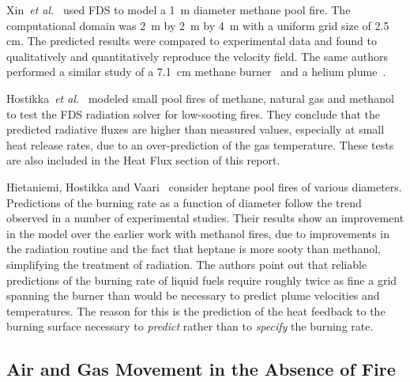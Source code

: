 Xin~{\em et  al.}~\cite{Xin:JSS2005} used FDS to model  a 1~m diameter methane pool  fire.  The  computational domain was  2~m by 2~m  by 4~m with  a
uniform  grid  size of  2.5  cm.  The  predicted results  were compared  to   experimental  data  and  found   to  qualitatively  and quantitatively
reproduce   the  velocity  field.   The  same  authors performed a similar study of a 7.1~cm methane burner~\cite{Xin:CF2005} and a helium
plume~\cite{Xin:CS2002}.

Hostikka~{\em et al.}~\cite{Hostikka:3} modeled small pool fires of
methane, natural gas and methanol  to test the FDS radiation solver for low-sooting
fires.  They conclude that the predicted radiative fluxes are higher than measured values, especially at small heat
release rates, due to an over-prediction of the gas temperature. These
tests are also included in the Heat Flux section of this report.

Hietaniemi,  Hostikka and  Vaari~\cite{Hietaniemi:1}  consider heptane pool fires of various diameters.  Predictions of the burning rate as a
function  of  diameter  follow  the  trend observed  in  a  number  of experimental studies.  Their results show an improvement  in the model over
the earlier work with  methanol fires, due to improvements in the radiation  routine  and the  fact  that  heptane  is more  sooty  than methanol,
simplifying  the treatment of radiation.   The authors point out  that reliable  predictions of  the burning  rate of  liquid fuels require roughly
twice as fine a grid spanning the burner than would be necessary to predict plume velocities and temperatures. The reason for this is  the prediction
of the heat  feedback to the  burning surface necessary to {\em predict} rather  than to {\em specify} the burning rate.


\subsection{Air and Gas Movement in the Absence of Fire}


